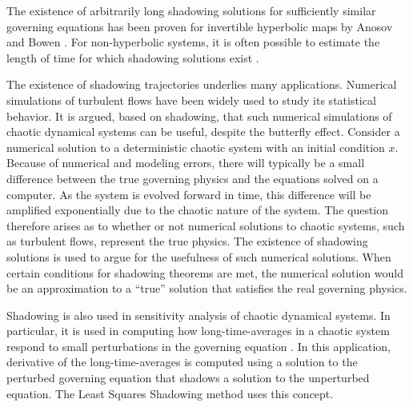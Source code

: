 The existence of arbitrarily long shadowing solutions for sufficiently similar governing equations
has been proven for invertible hyperbolic maps by Anosov \cite{anosov} and Bowen \cite{bowen}.
For non-hyperbolic systems, it is often possible to estimate the length of time for which shadowing
solutions exist \cite{grebogi}\cite{hammel}.

The existence of shadowing trajectories underlies many applications.
Numerical simulations of turbulent flows have been widely used to study its statistical behavior.
It is argued, based on shadowing, that such numerical simulations of chaotic dynamical systems can be
useful, despite the butterfly effect. Consider a numerical solution to a deterministic chaotic system with an initial condition $x$.
Because of numerical and modeling errors, there will typically be a small difference between the
true governing physics and the equations solved on a computer.  As the system is evolved forward
in time, this difference will be amplified exponentially due to the chaotic nature of the system.
The question therefore arises as to whether or not numerical solutions to chaotic systems, such
as turbulent flows, represent the true physics.  The existence of shadowing solutions
is used to argue for the usefulness of such numerical solutions.
When certain conditions for shadowing theorems are met, the numerical solution would be an
approximation to a ``true'' solution that satisfies the real governing physics.

Shadowing is also used in sensitivity analysis of chaotic dynamical systems.  In particular,
it is used in computing how long-time-averages in a chaotic system
respond to small perturbations in the governing equation \cite{qiqi-lss}\cite{angxiu-lss}\cite{lasagna}. In this application, derivative
of the long-time-averages is computed using a solution to the perturbed governing equation
that shadows a solution to the unperturbed equation.  The Least Squares Shadowing \cite{qiqi-lss}\cite{angxiu-lss} method
uses this concept.


